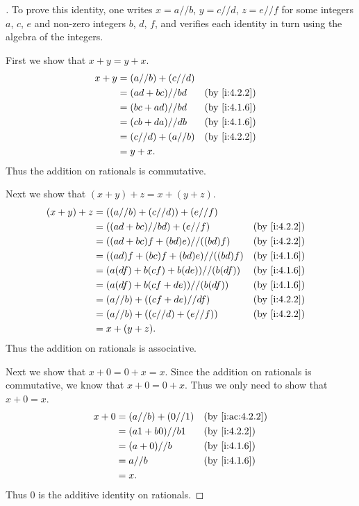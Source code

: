 \begin{proof}[]
  To prove this identity, one writes \(x = a // b\), \(y = c // d\), \(z = e // f\) for some integers \(a\), \(c\), \(e\) and non-zero integers \(b\), \(d\), \(f\), and verifies each identity in turn using the algebra of the integers.

  First we show that \(x + y = y + x\).
  \begin{align*}
    x + y & = (a // b) + (c // d)                   \\
          & = (ad + bc) // bd     &  & \by{i:4.2.2} \\
          & = (bc + ad) // bd     &  & \by{i:4.1.6} \\
          & = (cb + da) // db     &  & \by{i:4.1.6} \\
          & = (c // d) + (a // b) &  & \by{i:4.2.2} \\
          & = y + x.
  \end{align*}
  Thus the addition on rationals is commutative.

  Next we show that \((x + y) + z = x + (y + z)\).
  \begin{align*}
    (x + y) + z & = ((a // b) + (c // d)) + (e // f)                     \\
                & = ((ad + bc) // bd) + (e // f)       &  & \by{i:4.2.2} \\
                & = ((ad + bc)f + (bd)e) // ((bd)f)    &  & \by{i:4.2.2} \\
                & = ((ad)f + (bc)f + (bd)e) // ((bd)f) &  & \by{i:4.1.6} \\
                & = (a(df) + b(cf) + b(de)) // (b(df)) &  & \by{i:4.1.6} \\
                & = (a(df) + b(cf + de)) // (b(df))    &  & \by{i:4.1.6} \\
                & = (a // b) + ((cf + de) // df)       &  & \by{i:4.2.2} \\
                & = (a // b) + ((c // d) + (e // f))   &  & \by{i:4.2.2} \\
                & = x + (y + z).
  \end{align*}
  Thus the addition on rationals is associative.

  Next we show that \(x + 0 = 0 + x = x\).
  Since the addition on rationals is commutative, we know that \(x + 0 = 0 + x\).
  Thus we only need to show that \(x + 0 = x\).
  \begin{align*}
    x + 0 & = (a // b) + (0 // 1) &  & \by{i:ac:4.2.2} \\
          & = (a1 + b0) // b1     &  & \by{i:4.2.2}    \\
          & = (a + 0) // b        &  & \by{i:4.1.6}    \\
          & = a // b              &  & \by{i:4.1.6}    \\
          & = x.
  \end{align*}
  Thus \(0\) is the additive identity on rationals.


\end{proof}
